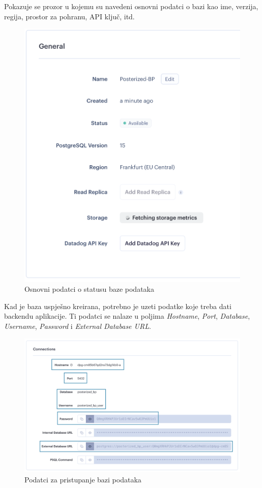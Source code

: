 \begin{enumerate}
			Pokazuje se prozor u kojemu su navedeni osnovni podatci o bazi kao ime, verzija, regija, prostor za pohranu, API ključ, itd.
			\begin{figure}[H]
				\includegraphics[scale=0.3]{slike/deploy/database3.png} %
				\centering
				\caption{Osnovni podatci o statusu baze podataka}
				\label{fig:promjene}
			\end{figure}
			
			Kad je baza uspješno kreirana, potrebno je uzeti podatke koje treba dati backendu aplikacije. Ti podatci se nalaze u poljima \textit{Hostname}, \textit{Port}, \textit{Database}, \textit{Username}, \textit{Password} i \textit{External Database URL}.
			\begin{figure}[H]
				\includegraphics[scale=0.4]{slike/deploy/database4.png} %
				\centering
				\caption{Podatci za pristupanje bazi podataka}
				\label{fig:promjene}
			\end{figure}
			

\end{enumerate}
